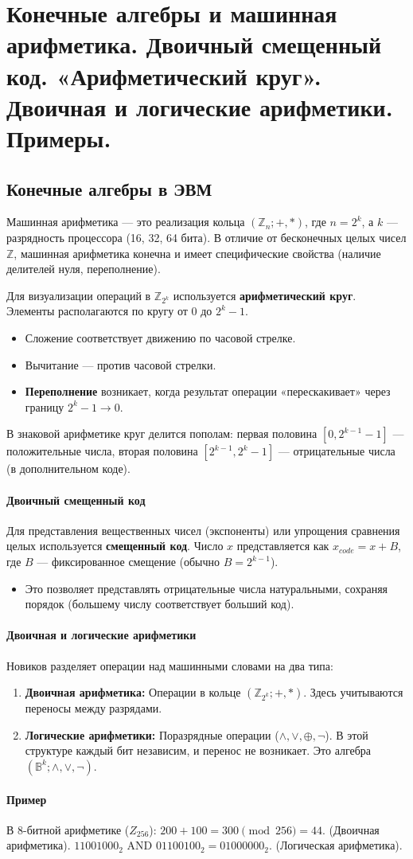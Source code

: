 \section{Конечные алгебры и машинная арифметика. Двоичный смещенный код. «Арифметический круг». Двоичная и логические арифметики. Примеры.}

\subsection*{Конечные алгебры в ЭВМ}
Машинная арифметика — это реализация кольца $(\mathbb{Z}_n; +, \ast)$, где $n = 2^k$, а $k$ — разрядность процессора (16, 32, 64 бита). В отличие от бесконечных целых чисел $\mathbb{Z}$, машинная арифметика конечна и имеет специфические свойства (наличие делителей нуля, переполнение).

Для визуализации операций в $\mathbb{Z}_{2^k}$ используется \textbf{арифметический круг}. Элементы располагаются по кругу от $0$ до $2^k-1$. 
\begin{itemize}
    \item Сложение соответствует движению по часовой стрелке.
    \item Вычитание — против часовой стрелки.
    \item \textbf{Переполнение} возникает, когда результат операции «перескакивает» через границу $2^k-1 \to 0$.
\end{itemize}
В знаковой арифметике круг делится пополам: первая половина $[0, 2^{k-1}-1]$ — положительные числа, вторая половина $[2^{k-1}, 2^k-1]$ — отрицательные числа (в дополнительном коде).

\paragraph{Двоичный смещенный код}
Для представления вещественных чисел (экспоненты) или упрощения сравнения целых используется \textbf{смещенный код}. 
Число $x$ представляется как $x_{code} = x + B$, где $B$ — фиксированное смещение (обычно $B = 2^{k-1}$).
\begin{itemize}
    \item Это позволяет представлять отрицательные числа натуральными, сохраняя порядок (большему числу соответствует больший код).
\end{itemize}

\paragraph{Двоичная и логические арифметики}
Новиков разделяет операции над машинными словами на два типа:
\begin{enumerate}
    \item \textbf{Двоичная арифметика:} Операции в кольце $(\mathbb{Z}_{2^k}; +, \ast)$. Здесь учитываются переносы между разрядами.
    \item \textbf{Логические арифметики:} Поразрядные операции ($\land, \lor, \oplus, \neg$). В этой структуре каждый бит независим, и перенос не возникает. Это алгебра $(\mathbb{B}^k; \land, \lor, \neg)$.
\end{enumerate}

\paragraph{Пример}
В 8-битной арифметике ($Z_{256}$):
$200 + 100 = 300 \pmod{256} = 44$. (Двоичная арифметика).
$11001000_2 \text{ AND } 01100100_2 = 01000000_2$. (Логическая арифметика).
